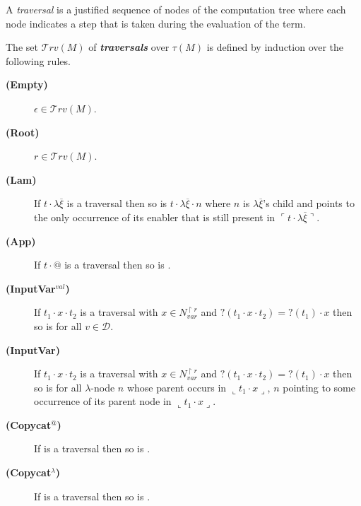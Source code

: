 \documentclass{llncs}
\newcommand\defname[1]{{\bf\em #1}\index{#1}}
\newcommand\travset{\mathcal{T}rv}
\newcommand{\oview}[1]{\llcorner #1 \lrcorner}
\newcommand{\pview}[1]{\ulcorner #1 \urcorner}
\begin{document}
A \emph{traversal} is a justified sequence of nodes of the computation tree where each node
indicates a step that is taken during the evaluation of the term.
\begin{definition}\rm
\label{def:traversal}
The set $\travset(M)$ of \defname{traversals} over $\tau(M)$ is defined by induction over the following rules.

\begin{description}
\item[{\bf (Empty)}] $\epsilon \in \travset(M)$.
\item[{\bf (Root)}] $ r \in \travset(M)$.
\item[{\bf (Lam)}] If $t \cdot \lambda \overline{\xi}$ is a traversal then so is
$t \cdot \lambda \overline{\xi} \cdot n$
where $n$ is $\lambda \overline{\xi}$'s child and points to the only occurrence of its enabler that is still present in $\pview{t \cdot \lambda \overline{\xi}}$.

\item[{\bf (App)}] If $t \cdot @$ is a traversal then so is .

\item[{\bf (InputVar$^{val}$)}] If $t_1 \cdot x \cdot t_2$ is a traversal
with $x \in N_{var}^{\upharpoonright r}$ and $?(t_1 \cdot x \cdot t_2)=?(t_1) \cdot x$ then so is
for all $v \in \mathcal{D}$.

\item[{\bf (InputVar)}] If $t_1 \cdot x \cdot t_2$ is a traversal with
  $x \in N_{var}^{\upharpoonright r}$ and $?(t_1 \cdot x \cdot
  t_2)=?(t_1) \cdot x$ then so is  for all
  $\lambda$-node $n$ whose parent occurs in $\oview{t_1 \cdot x}$, $n$
  pointing to some occurrence of its parent node in $\oview{t_1 \cdot x}$.


\item[{\bf (Copycat$^@$)}]
  If  is a traversal then so is
.

\item[{\bf (Copycat$^\lambda$)}] If 
is a traversal then so is
.


\end{description}
\end{definition}
\end{document}

